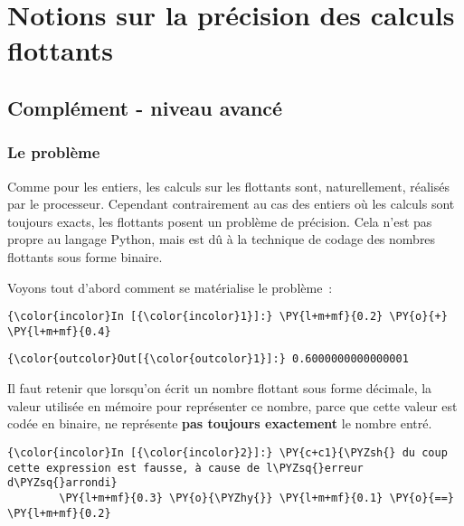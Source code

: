     
    
    
    

    

    \hypertarget{notions-sur-la-pruxe9cision-des-calculs-flottants}{%
\section{Notions sur la précision des calculs
flottants}\label{notions-sur-la-pruxe9cision-des-calculs-flottants}}

    \hypertarget{compluxe9ment---niveau-avancuxe9}{%
\subsection{Complément - niveau
avancé}\label{compluxe9ment---niveau-avancuxe9}}

    \hypertarget{le-probluxe8me}{%
\subsubsection{Le problème}\label{le-probluxe8me}}

    Comme pour les entiers, les calculs sur les flottants sont,
naturellement, réalisés par le processeur. Cependant contrairement au
cas des entiers où les calculs sont toujours exacts, les flottants
posent un problème de précision. Cela n'est pas propre au langage
Python, mais est dû à la technique de codage des nombres flottants sous
forme binaire.

    Voyons tout d'abord comment se matérialise le problème~:

    \begin{Verbatim}[commandchars=\\\{\}]
{\color{incolor}In [{\color{incolor}1}]:} \PY{l+m+mf}{0.2} \PY{o}{+} \PY{l+m+mf}{0.4}
\end{Verbatim}


\begin{Verbatim}[commandchars=\\\{\}]
{\color{outcolor}Out[{\color{outcolor}1}]:} 0.6000000000000001
\end{Verbatim}
            
    Il faut retenir que lorsqu'on écrit un nombre flottant sous forme
décimale, la valeur utilisée en mémoire pour représenter ce nombre,
parce que cette valeur est codée en binaire, ne représente \textbf{pas
toujours exactement} le nombre entré.

    \begin{Verbatim}[commandchars=\\\{\}]
{\color{incolor}In [{\color{incolor}2}]:} \PY{c+c1}{\PYZsh{} du coup cette expression est fausse, à cause de l\PYZsq{}erreur d\PYZsq{}arrondi}
        \PY{l+m+mf}{0.3} \PY{o}{\PYZhy{}} \PY{l+m+mf}{0.1} \PY{o}{==} \PY{l+m+mf}{0.2}
\end{Verbatim}


